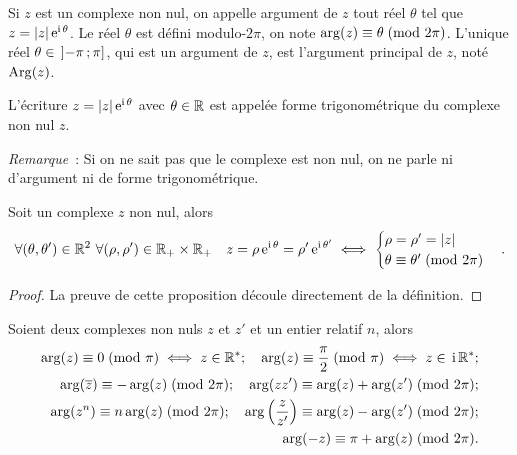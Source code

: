 \begin{defdef}
  Si \(z\) est un complexe non nul, on appelle argument de \(z\) tout réel
  \(\theta\) tel que \(z = \left\lvert z\right\rvert \operatorname{e}^{\operatorname{i} \theta}\).  Le réel \(\theta\) est
  défini modulo-\(2\pi\), on note \(\arg(z) \equiv \theta\!\pmod {2\pi}\). L'unique
  réel \(\theta \in{}\left] -\pi \, ; {} \pi \right]\), qui est un argument de \(z\),
  est l'argument principal de \(z\), noté \(\operatorname{Arg}(z)\).
\end{defdef}

L'écriture \(z = \left\lvert z\right\rvert \operatorname{e}^{\operatorname{i} \theta}\) avec \(\theta \in{}\mathbb{R}\) est appelée
forme trigonométrique du complexe non nul \(z\).

\emph{Remarque}~: Si on ne sait pas que le complexe est non nul, on ne parle ni
d'argument ni de forme trigonométrique.

\begin{prop}
  Soit un complexe \(z\) non nul, alors
  \begin{equation}
    \forall (\theta, \theta') \in{}\mathbb{R}^2 \ \forall (\rho, \rho') \in{}\mathbb{R}_{+}
    \times \mathbb{R}_{+} \quad z = \rho \operatorname{e}^{\operatorname{i} \theta} = \rho' \operatorname{e}^{\operatorname{i} \theta'}
    \iff
    \begin{cases}
      \rho = \rho' = \left\lvert z\right\rvert \\
      \theta \equiv \theta'\!\pmod {2\pi}
    \end{cases}.
  \end{equation}
\end{prop}

\begin{proof}
  La preuve de cette proposition découle directement de la définition.
\end{proof}

\begin{prop}
  Soient deux complexes non nuls \(z\) et \(z'\) et un entier relatif \(n\),
  alors
  \begin{align*}
    \arg(z) \equiv 0\!\pmod {\pi} \iff z \in{}\mathbb{R}^*; \quad
    \arg(z) \equiv \frac{\pi}{2}\!\pmod {\pi} \iff z \in{}\operatorname{i}\mathbb{R}^{*};\\
    \arg(\overline{z}) \equiv -\arg(z)\!\pmod {2\pi}; \quad \arg(z
    z') \equiv \arg(z) + \arg(z')\!\pmod {2\pi}; \\
    \arg(z^n) \equiv n \arg(z)\!\pmod {2\pi}; \quad \arg
    \left(\frac{z}{z'} \right) \equiv \arg(z) - \arg(z') \!\pmod {2\pi}; \\
    \arg(-z) \equiv \pi + \arg(z)\!\pmod {2\pi}.
  \end{align*}
\end{prop}

